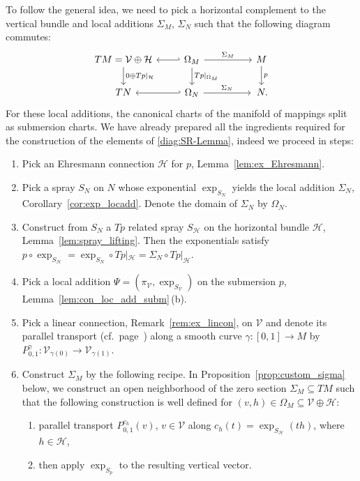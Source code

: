 \documentclass[11pt]{article}
\numberwithin{equation}{section}
\numberwithin{equation}{section}
\newcommand{\cH}{\ensuremath{\mathcal{H}}}
\newcommand{\cV}{\ensuremath{\mathcal{V}}}
\begin{document}
To follow the general idea, we need to pick a horizontal complement to the vertical bundle and local additions $\Sigma_M$, $\Sigma_N$ such that the following diagram commutes:
\begin{equation}\label{diag:SR-Lemma}
\begin{tikzcd}
 TM=\mathcal{V} \oplus \mathcal{H} \arrow[d, ,"0\oplus Tp|_{\mathcal{H}}"] & \arrow[l,hook'] \Omega_M \arrow[rr,"\Sigma_M"] \arrow[d,"Tp|_{\Omega_M}"] & &M \arrow[d,"p"]\\ TN & \arrow[l, hook'] \Omega_N \arrow[rr,"\Sigma_N"] & &\,N.
\end{tikzcd}
\end{equation}
For these local additions, the canonical charts of the manifold of mappings split as submersion charts.
We have already prepared all the ingredients required for the construction of the elements of \eqref{diag:SR-Lemma}, indeed we proceed in steps:
\begin{enumerate}\itemsep=0pt
\item Pick an Ehresmann connection $\cH$ for $p$, Lemma~\ref{lem:ex_Ehresmann}.
\item Pick a spray $S_N$ on $N$ whose exponential $\exp_{S_N}$ yields the local addition $\Sigma_N$, Corollary~\ref{cor:exp_locadd}. Denote the domain of $\Sigma_N$ by $\Omega_N$.
\item Construct from $S_N$ a $Tp$ related spray $S_\cH$ on the horizontal bundle $\cH$, Lemma~\ref{lem:spray_lifting}. Then the exponentials satisfy $p \circ \exp_{S_\cH} = \exp_{S_N} \circ Tp|_\cH = \Sigma_N \circ Tp|_{\cH}.$
\item Pick a local addition $\Psi=(\pi_{\cV},\exp_{S_{\cV}})$ on the submersion $p$, Lemma~\ref{lem:con_loc_add_subm}\,(b).
\item Pick a linear connection, Remark~\ref{rem:ex_lincon}, on $\cV$ and denote its parallel transport (cf.\ page~\pageref{setup:parallel_tp}) along a smooth curve $\gamma \colon [0,1] \rightarrow M$ by $P^\gamma_{0,1}\colon \cV_{\gamma(0)} \rightarrow \cV_{\gamma(1)}$.
\item Construct $\Sigma_M$ by the following recipe. In Proposition~\ref{prop:custom_sigma} below, we construct an open neighborhood of the zero section $\Sigma_M \subseteq TM$ such that the following construction is well defined for $(v,h) \in \Omega_M \subseteq \cV \oplus \cH$:
\begin{enumerate}\itemsep=0pt
\item parallel transport $P_{0,1}^{c_h}(v)$, $v\in \cV$ along $c_h(t)=\exp_{S_\cH}(th)$, where $h \in \cH$,
\item then apply $\exp_{S_p}$ to the resulting vertical vector.
\end{enumerate}
\end{enumerate}
\end{document}
